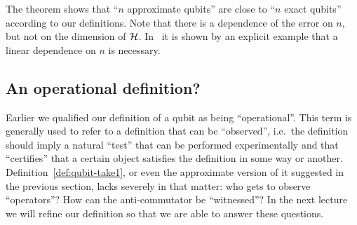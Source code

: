 The theorem shows that ``$n$ approximate qubits'' are close to ``$n$ exact qubits'' according to our definitions. Note that there is a dependence of the error on $n$, but not on the dimension of $\mathcal{H}$. In~\cite{chao2017overlapping} it is shown by an explicit example that a linear dependence on $n$ is necessary. 



\subsection{An operational definition?}

Earlier we qualified our definition of a qubit as being ``operational''. This term is generally used to refer to a definition that can be ``observed'', i.e.\ the definition should imply a natural ``test'' that can be performed experimentally and that ``certifies'' that a certain object satisfies the definition in some way or another. Definition~\ref{def:qubit-take1}, or even the approximate version of it suggested in the previous section, lacks severely in that matter: who gets to observe ``operators''? How can the anti-commutator be ``witnessed''? In the next lecture we will refine our definition so that we are able to answer these questions. 





